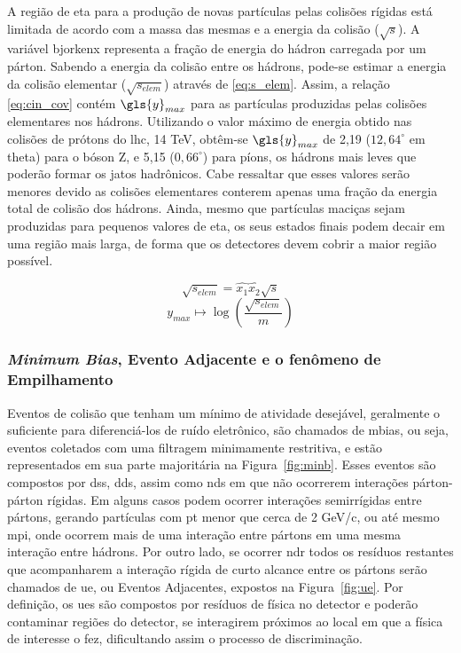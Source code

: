 A região de \gls{eta} para a produção de novas partículas pelas colisões
rígidas está limitada de acordo com a \gls{massa} das mesmas
e a energia da colisão ($\sqrt{s}$). A variável \gls{bjorkenx} representa a
fração de energia do hádron carregada por um párton. Sabendo a energia da colisão entre os
hádrons, pode-se estimar a energia da colisão elementar ($\sqrt{s_{elem}}$)
através de \ref{eq:s_elem}. Assim, a relação \ref{eq:cin_cov} contém $\gls{y}_{max}$
para as partículas produzidas pelas colisões elementares nos hádrons.
Utilizando o valor máximo de energia obtido nas colisões de prótons do \gls{lhc}, 14 TeV, 
obtêm-se $\gls{y}_{max}$ de 2,19 ($12,64^{\circ}$ em \gls{theta}) para o bóson Z, 
e 5,15 ($0,66^{\circ}$) para píons, os hádrons mais leves que poderão formar os
jatos hadrônicos. Cabe ressaltar que esses valores serão menores devido as
colisões elementares conterem apenas uma fração da energia total 
de colisão dos hádrons. Ainda, mesmo que partículas maciças sejam produzidas
para pequenos valores de \gls{eta}, os seus estados finais podem decair em uma
região mais larga, de forma que os detectores devem cobrir a maior região
possível.

\begin{equation}\label{eq:s_elem}
\sqrt{s_{elem}} = \hat{x_1} \hat{x_2} \sqrt{s}
\end{equation}
\begin{equation}\label{eq:cin_cov}
y_{max} \longmapsto \log\left( \frac{\sqrt{s_{elem}}}{m}\right)
\end{equation}


\subsubsection{\emph{Minimum Bias}, Evento Adjacente e o fenômeno de Empilhamento}
\label{sssec:minb_ue_pileup}

Eventos de colisão que tenham um mínimo de atividade desejável,
geralmente o suficiente para diferenciá-los de ruído eletrônico, 
são chamados de \gls{mbias}, ou
seja, eventos coletados com uma filtragem minimamente restritiva, e estão
representados em sua parte majoritária na Figura~\ref{fig:minb}. Esses
eventos são compostos por \glspl{ds}, \glspl{dd}, assim como \glspl{nd} em
que não ocorrerem interações párton-párton rígidas. Em alguns casos podem
ocorrer interações semirrígidas entre pártons, gerando partículas com \gls{pt}
menor que cerca de 2 GeV/c, ou até mesmo \gls{mpi}, onde ocorrem mais de uma
interação entre pártons em uma mesma interação entre hádrons. 
Por outro lado, se ocorrer \gls{ndr} 
todos os resíduos restantes que acompanharem a interação rígida de curto alcance
entre os pártons serão chamados de \gls{ue}, ou Eventos Adjacentes, expostos na
Figura~\ref{fig:ue}.
Por definição, os \glspl{ue} são compostos por resíduos de física no
detector e poderão contaminar regiões do detector, se interagirem próximos 
ao local em que a física de interesse o fez, dificultando assim o
processo de discriminação.

